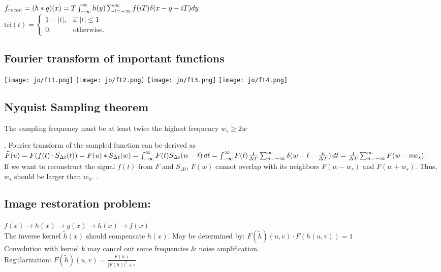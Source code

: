 $f_{recon} = (h*g)(x) =\\
T \int_{-\infty}^{\infty} h(y) \sum_{i = -\infty}^{\infty} f(iT) \delta(x-y-iT)dy$\\
$\text{tri}(t) = \begin{cases} 1 - |t|, & \text{if } |t| \leq 1 \\ 0, & \text{otherwise.} \end{cases}$

\subsection*{Fourier transform of important functions}
\texttt{[image: jo/ft1.png]}
\texttt{[image: jo/ft2.png]}
\texttt{[image: jo/ft3.png]}
\texttt{[image: jo/ft4.png]}

\subsection*{Nyquist Sampling theorem}
The sampling frequency must be at least twice the highest frequency $w_s \geq 2 w$ 

 . Fourier transform of the sampled function can be derived as
$
\tilde{F}(u) = F(f(t) \cdot S_{\Delta t}(t)) \\
            = F(u) * S_{\Delta t}(w) \\
            = \int_{-\infty}^{\infty} F(\tilde{t}) S_{\Delta t}(w - \tilde{t}) \, d\tilde{t} \\
            = \int_{-\infty}^{\infty} F(\tilde{t}) \frac{1}{\Delta T} \sum_{n = -\infty}^{\infty} \delta (w - \tilde{t} - \frac{n}{\Delta T}) \, d\tilde{t} \\
            = \frac{1}{\Delta T} \sum_{n = -\infty}^{\infty} F(w - n w_s).
$\\
If we want to reconstruct the signal $f(t)$ from $F$ and $S_{\Delta t}$, $F(w)$ cannot overlap with its neighbors $F(w - w_s)$ and $F(w + w_s)$. Thus, $w_s$ should be larger than $w_n$. .
\subsection*{Image restoration problem:}
$f(x) \rightarrow h(x) \rightarrow g(x) \rightarrow \tilde{h}(x) \rightarrow f(x)$\\
The inverse kernel $\tilde{h}(x)$ should compensate $h(x)$. May be determined by: $F(\tilde{h})(u, v) \cdot F(h(u, v)) = 1$\\
 Convolution with kernel $k$ may cancel out some frequencies \& noise amplification. \\
 Regularization: $F(\tilde{h})(u, v) = \frac{F(h)}{{|F(h)|}^{2} + \epsilon}$ 
